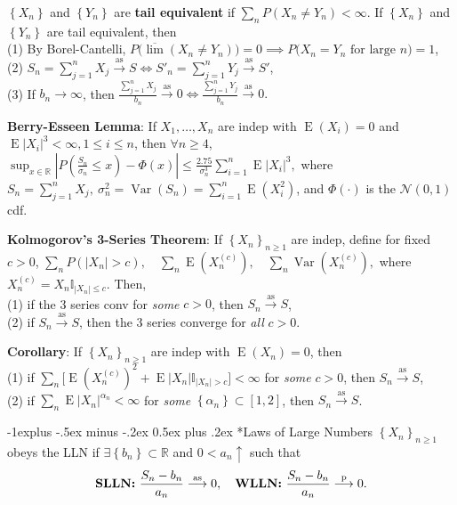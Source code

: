 \documentclass[paper=letter,fontsize=2.89mm]{scrartcl}
\makeatletter
\DeclareMathOperator{\Var}{Var}
\DeclareMathOperator{\E}{E}
\newcommand{\convprob}{\stackrel{\text{p}}{\longrightarrow}}
\newcommand{\convas}{\stackrel{\text{as}}{\longrightarrow}}
\newcommand{\Norm}{\mathcal{N}}
\newcommand{\R}{\mathbb{R}}
\newcommand\indicate[1]{\mathbb{I}_{ #1 }}
\newcommand\abs[1]{\left| #1 \right|}
\newcommand\set[1]{\left\{ #1 \right\}}
\renewcommand{\subsection}{\@startsection{subsection}{2}{0mm}%
                                {-1explus -.5ex minus -.2ex}%
                                {0.5ex plus .2ex}%
                                {\normalfont\normalsize\bfseries}}
\makeatother
\begin{document}
\begin{multicols*}{3}
$\set{X_n}$ and $\set{Y_n}$ are \textbf{tail equivalent} if $\sum_n P(X_n \ne Y_n) < \infty$. If $\set{X_n}$ and $\set{Y_n}$ are tail equivalent, then \\
(1) By Borel-Cantelli, $P\big(\overline{\lim}(X_n \ne Y_n)\big) = 0 \implies P\big(X_n = Y_n \text{ for large } n\big) = 1$,  \\
(2) $S_n = \sum_{j=1}^n X_j \convas S \iff S'_n = \sum_{j=1}^n Y_j \convas S'$, \\
(3) If $b_n \to \infty$, then $\frac{\sum_{j=1}^n X_j}{b_n} \convas 0 \iff \frac{\sum_{j=1}^n Y_j}{b_n} \convas 0.$ \\ \medskip

\textbf{Berry-Esseen Lemma}: If $X_1, \dots, X_n$ are indep with $\E(X_i) = 0$ and $\E\abs{X_i}^3 < \infty, 1 \le i \le n$, then $\forall n \ge 4$,
$\sup_{x\in\R} \abs{P\left(\frac{S_n}{\sigma_n} \le x \right) - \Phi(x)} \le \frac{2.75}{\sigma^3_n}\sum_{i=1}^n \E\abs{X_i}^3,$
where $S_n = \sum_{j=1}^n X_j, ~\sigma^2_n = \Var(S_n) = \sum_{i=1}^n \E(X_i^2)$, and $\Phi(\cdot)$ is the $\Norm(0,1)$ cdf. \\ \medskip

\textbf{Kolmogorov's 3-Series Theorem}: If $\set{X_n}_{n\ge1}$ are indep, define for fixed $c > 0$,
$\sum_n P(\abs{X_n} > c), \quad \sum_n \E(X_n^{(c)}), \quad \sum_n \Var(X_n^{(c)}),$
where $X_n^{(c)} = X_n \indicate{\abs{X_n} \le c}$. Then, \\
(1) if the 3 series conv for \emph{some} $c > 0$, then $S_n \convas S$, \\
(2) if $S_n \convas S$, then the 3 series converge for \emph{all} $c > 0$. \\ \medskip

\textbf{Corollary}: If $\set{X_n}_{n\ge1}$ are indep with $\E(X_n) = 0$, then \\
(1) if $\sum_n\big[ \E(X_n^{(c)})^2 + \E\abs{X_n}\indicate{\abs{X_n} > c}\big] < \infty$ for \emph{some} $c > 0$, then $S_n \convas S$, \\
(2) if $\sum_n \E\abs{X_n}^{\alpha_n} < \infty$ for \emph{some} $\set{\alpha_n} \subset [1,2]$, then $S_n \convas S$. \\ \medskip


\subsection*{Laws of Large Numbers}
$\set{X_n}_{n\ge1}$ obeys the LLN if $\exists \set{b_n} \subset \R$ and $0 < a_n \uparrow$ such that
$$\text{\bf{SLLN}:}~ \frac{S_n - b_n}{a_n} \convas 0, \quad \text{\bf{WLLN}:}~ \frac{S_n - b_n}{a_n} \convprob 0 .$$


\end{multicols*}
\end{document}
